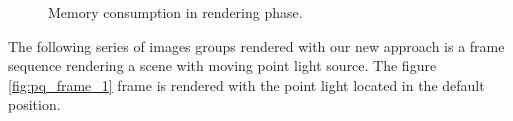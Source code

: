 \begin{figure}[htp] 
\begin{center}
    \renewcommand{\thefigure}{\thechapter.\arabic{figure}}
    \caption[]{Memory consumption in rendering phase.}
    \label{fig:pm_global} 
\end{center} 
\end{figure}   

The following series of images groups rendered with our new approach is a frame sequence rendering a scene with moving point light source. The figure \ref{fig:pq_frame_1} frame is rendered with the point light located in the default position.  

